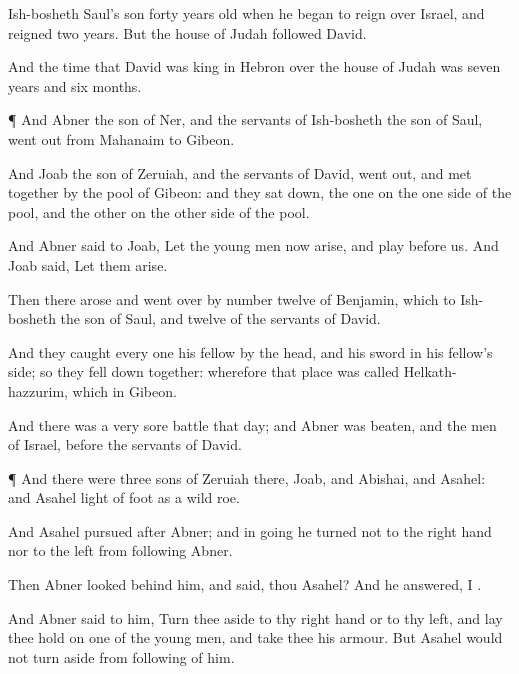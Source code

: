 {Ish-bosheth
Saul’s
son
{}
forty
years
old when he began to
reign over
Israel, and
reigned
two
years. But the
house of
Judah
followed
David.

And the
time that
David was
king in
Hebron over the
house of
Judah was
seven
years and
six
months.


\par }{\PP {}¶ And
Abner the
son of
Ner, and the
servants of
Ish-bosheth the
son of
Saul, went
out from
Mahanaim to
Gibeon.

And
Joab the
son of
Zeruiah, and the
servants of
David, went
out, and
met
together by the
pool of
Gibeon: and they sat
down, the one on the one side of the
pool, and the other on the other side of the
pool.

And
Abner
said to
Joab, Let the young
men now
arise, and
play
before us. And
Joab
said, Let them
arise.

Then there
arose and went
over by
number
twelve of
Benjamin, which
{} to
Ish-bosheth the
son of
Saul, and
twelve of the
servants of
David.

And they
caught every
one his
fellow by the
head, and
{} his
sword in his
fellow’s
side; so they fell
down
together: wherefore that
place was
called
Helkath-hazzurim, which
{} in
Gibeon.

And there was a
very
sore
battle that
day; and
Abner was
beaten, and the
men of
Israel,
before the
servants of
David.


\par }{\PP {}¶ And there were
three
sons of
Zeruiah there,
Joab, and
Abishai, and
Asahel: and
Asahel
{}
light of
foot as
a
wild
roe.

And
Asahel
pursued
after
Abner; and in
going he
turned not to the right
hand nor to the
left from
following
Abner.

Then
Abner
looked
behind him, and
said,
{} thou
Asahel? And he
answered, I
{}.

And
Abner
said to him, Turn thee
aside to thy right
hand or to thy
left, and lay thee
hold on
one of the young
men, and
take thee his
armour. But
Asahel
would not turn
aside from
following of him.

}
